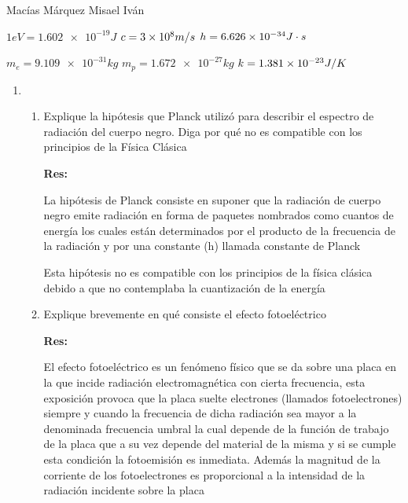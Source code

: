 \documentclass[12pt,a4paper]{article}
\begin{document}
Macías Márquez Misael Iván

$1 eV = \num{1.602 e-19} J $ \hspace{1cm} $c = \num{3 e 8} m/s $ \hspace{1cm} $h = \num{6.626 e -34}J \cdot s$

$m_e = \num{9.109 e-31}kg$ \hspace{1cm} $m_p = \num{1.672e-27}kg$ \hspace{1cm} $k = \num{1.381 e -23 }J/K$
\begin{enumerate}
 


    \item \begin{enumerate}
        \item Explique la hipótesis que Planck utilizó para describir el espectro de radiación del cuerpo negro. Diga por qué no es compatible con los principios de la Física Clásica
        
        \textbf{Res:}
        
        La hipótesis de Planck consiste en suponer que la radiación de cuerpo negro emite radiación en forma de paquetes nombrados como cuantos de energía los cuales están determinados por el producto de la frecuencia de la radiación y por una constante (h) llamada constante de Planck 
        
        Esta hipótesis no es compatible con los principios de la física clásica debido a que no contemplaba la cuantización de la energía  
        
        \item Explique brevemente en qué consiste el efecto fotoeléctrico
        
        \textbf{Res:}
        
        El efecto fotoeléctrico es un fenómeno físico que se da sobre una placa en la que incide radiación electromagnética con cierta frecuencia, esta exposición provoca que la placa suelte electrones (llamados fotoelectrones) siempre y cuando la frecuencia de dicha radiación sea mayor a la denominada frecuencia umbral la cual depende de la función de trabajo de la placa que a su vez depende del material de la misma y si se cumple esta condición la fotoemisión es inmediata. Además la magnitud de la corriente de los fotoelectrones es proporcional a la intensidad de la radiación incidente sobre la placa
    \end{enumerate}
    
    
    

\end{enumerate}
\end{document}
